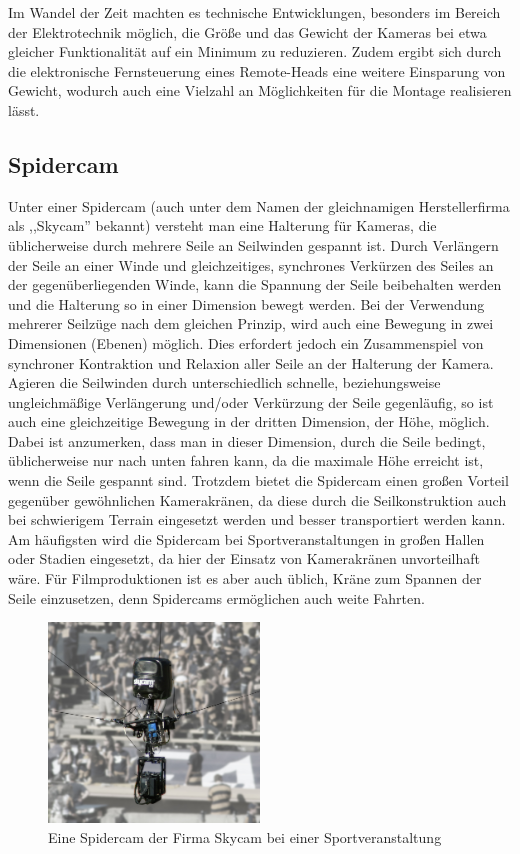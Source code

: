 \documentclass[a4paper, 12pt, bibtotocnumbered, liststotocnumbered]{scrartcl}
\begin{document}
	Im Wandel der Zeit machten es technische Entwicklungen, besonders im Bereich der Elektrotechnik möglich, die Größe und das Gewicht der Kameras bei etwa gleicher Funktionalität auf ein Minimum zu reduzieren. Zudem ergibt sich durch die elektronische Fernsteuerung eines Remote-Heads eine weitere Einsparung von Gewicht, wodurch auch eine Vielzahl an Möglichkeiten für die Montage realisieren lässt.

	\subsection{Spidercam}
	Unter einer Spidercam (auch unter dem Namen der gleichnamigen Herstellerfirma als ,,Skycam” bekannt) versteht man eine Halterung für Kameras, die üblicherweise durch mehrere Seile an Seilwinden gespannt ist. Durch Verlängern der Seile an einer Winde und gleichzeitiges, synchrones Verkürzen des Seiles an der gegenüberliegenden Winde, kann die Spannung der Seile beibehalten werden und die Halterung so in einer Dimension bewegt werden. Bei der Verwendung mehrerer Seilzüge nach dem gleichen Prinzip, wird auch eine Bewegung in zwei Dimensionen (Ebenen) möglich. Dies erfordert jedoch ein Zusammenspiel von synchroner Kontraktion und Relaxion aller Seile an der Halterung der Kamera. Agieren die Seilwinden durch unterschiedlich schnelle, beziehungsweise ungleichmäßige Verlängerung und/oder Verkürzung der Seile gegenläufig, so ist auch eine gleichzeitige Bewegung in der dritten Dimension, der Höhe, möglich. Dabei ist anzumerken, dass man in dieser Dimension, durch die Seile bedingt, üblicherweise nur nach unten fahren kann, da die maximale Höhe erreicht ist, wenn die Seile gespannt sind. Trotzdem bietet die Spidercam einen großen Vorteil gegenüber gewöhnlichen Kamerakränen, da diese durch die Seilkonstruktion auch bei schwierigem Terrain eingesetzt werden und besser transportiert werden kann. Am häufigsten wird die Spidercam bei Sportveranstaltungen in großen Hallen oder Stadien eingesetzt, da hier der Einsatz von Kamerakränen unvorteilhaft wäre. Für Filmproduktionen ist es aber auch üblich, Kräne zum Spannen der Seile einzusetzen, denn Spidercams ermöglichen auch weite Fahrten.
	
	\begin{figure}[htb]
		\centering
		\includegraphics[width=0.5\textwidth]{Bilder/SkycamHDClipEnhanced0346}
		\caption[Quelle:\newline \url{http://de.wikipedia.org/w/index.php?title=Datei:SkycamHDClipEnhanced0346.jpg&filetimestamp=20070922180859}]{Eine Spidercam der Firma Skycam bei einer Sportveranstaltung}
	\end{figure}
\end{document}
